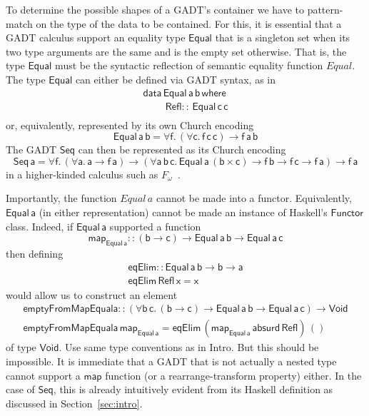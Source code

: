 \documentclass[acmsmall,screen,review,anonymous]{acmart}
\theoremstyle{definition}
\begin{document}
To determine the possible shapes of a GADT's container we have to
pattern-match on the type of the data to be contained. For this, it is
essential that a GADT calculus support an equality type
$\mathsf{Equal}$ that is a singleton set when its two type arguments
are the same and is the empty set otherwise. That is, the type
$\mathsf{Equal}$ must be the syntactic reflection of semantic equality
function $\mathit{Equal}$. The type $\mathsf{Equal}$ can either be
defined via GADT syntax, as in
\[\begin{array}{l}
\mathsf{data\, Equal\,a\,b\,where}\\
\mathsf{\;\;\;\;\;\;\;\;Refl ::\, Equal\,c\,c}\\
\end{array}\]
\noindent
or, equivalently, represented by its own Church encoding
\[\mathsf{Equal\,a\,b} = \mathsf{\forall f.\, (\forall c.\,
  f\,c\,c) \to f\,a\,b}\]
The GADT $\mathsf{Seq}$ can then be represented as its Church encoding
\[\mathsf{Seq\,a} = \mathsf{\forall f.\, (\forall a.\,a \to f\, a)
  \to (\forall a\,b\,c.\,Equal\,a\,(b\times c) \to f\,b \to f\,c \to
  f\,a) \to f\,a}\]
in a higher-kinded calculus such as $F_\omega$~\cite{atk12}.

Importantly, the function $\mathit{Equal}\,a$ cannot be made into a
functor. Equivalently, $\mathsf{Equal\,a}$ (in either representation)
cannot be made an instance of Haskell's $\mathsf{Functor}$
class. Indeed, if $\mathsf{Equal\,a}$ supported a function
\[\mathsf{map_{Equal\,a} :: (b \to c) \to Equal\,a\,b \to
  Equal\,a\,c}\]
then defining
\[\begin{array}{l}
\mathsf{eqElim :: Equal\, a\, b \to b \to a}\\
\mathsf{eqElim\, Refl\, x = x} 
\end{array}\]
would allow us to construct an element 
\[\begin{array}{l}
\mathsf{emptyFromMapEquala :: (\forall b\, c.\, (b \to c) \to Equal\, a\,
  b \to Equal\, a \,c) \to Void}\\ 
\mathsf{emptyFromMapEquala \,map_{Equal\,a} = eqElim\, (map_{Equal\,a}\,
  absurd\, Refl)\, ()}  
\end{array}\]
of type $\mathsf{Void}$. {\color{blue} Use same type conventions as in
  Intro.} But this should be impossible. It is immediate that a GADT
that is not actually a nested type cannot support a $\mathsf{map}$
function (or a rearrange-transform property) either. In the case of
$\mathsf{Seq}$, this is already intuitively evident from its Haskell
definition as discussed in Section~\ref{sec:intro}.
\end{document}

